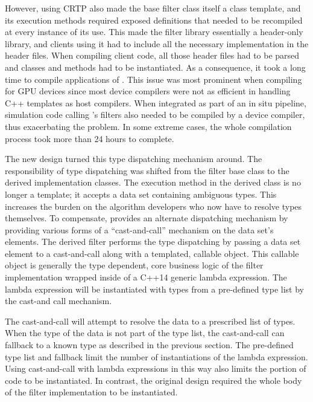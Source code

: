 However, using CRTP also made the base filter class itself a class template, and its execution methods required exposed definitions that needed to be recompiled at every instance of its use.
This made the \vtkm filter library essentially a header-only library, and clients using it had to include all the necessary implementation in the header files.
When compiling client code, all those header files had to be parsed and classes and methods had to be instantiated.
As a consequence, it took a long time to compile applications of \vtkm.
This issue was most prominent when compiling for GPU devices since most device compilers were not as efficient in handling C++ templates as host compilers.
When integrated as part of an in situ pipeline, simulation code calling \vtkm's filters also needed to be compiled by a device compiler, thus exacerbating the problem.
In some extreme cases, the whole compilation process took more than 24 hours to complete.

The new design turned this type dispatching mechanism around.
The responsibility of type dispatching was shifted from the filter base class to the derived implementation classes.
The execution method in the derived class is no longer a template; it accepts a data set containing ambiguous types.
This increases the burden on the algorithm developers who now have to resolve types themselves.
To compensate, \vtkm provides an alternate dispatching mechanism by providing various forms of a ``cast-and-call'' mechanism on the data set's elements.
The derived filter performs the type dispatching by passing a data set element to a cast-and-call along with a templated, callable object.
This callable object is generally the type dependent, core business logic of the filter implementation wrapped inside of a C++14 generic lambda expression.
The lambda expression will be instantiated with types from a pre-defined type list by the cast-and call mechanism.

The cast-and-call will attempt to resolve the data to a prescribed list of types.
When the type of the data is not part of the type list, the cast-and-call can fallback to a known type as described in the previous  section.
The pre-defined type list and fallback limit the number of instantiations of the lambda expression.
Using cast-and-call with lambda expressions in this way also limits the portion of code to be instantiated.
In contrast, the original design required the whole body of the filter implementation to be instantiated.

